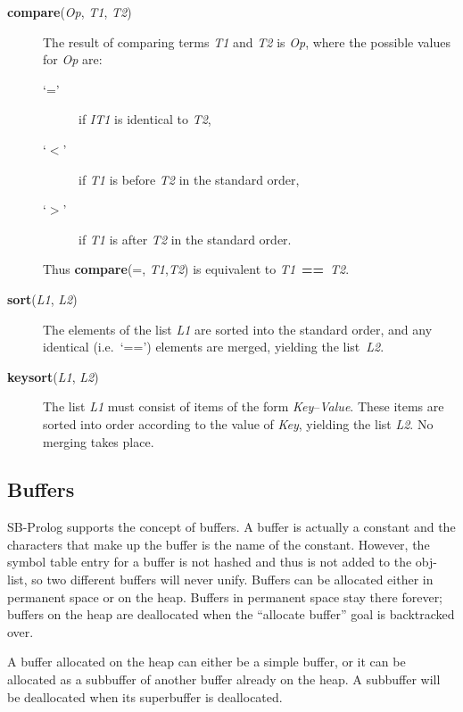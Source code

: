 \begin{description}
\item[{\bf compare}({\em Op}, {\em T1}, {\em T2})]
    The result of comparing terms {\em T1} and {\em T2} is {\em Op},
    where the possible values for {\em Op} are:
    \begin{description}
    \item[`='] if {\em IT1} is identical to {\em T2},

    \item[`$<$'] if {\em T1} is before {\em T2} in the standard order,

    \item[`$>$'] if {\em T1} is after {\em T2} in the standard order.
    \end{description}
    Thus {\bf compare}(=, {\em T1},{\em T2}) is equivalent to
    {\em T1}~{\bf ==}~{\em T2}.

\item[{\bf sort}({\em L1}, {\em L2})] 
    The elements of the list {\em L1} are sorted into the standard order,
    and any identical (i.e.\ `==') elements are merged,
    yielding the list~{\em L2}.

\item[{\bf keysort}({\em L1}, {\em L2})]
    The list {\em L1} must consist of items of the form {\em Key}--{\em Value}.
    These items are sorted into order according to the value of {\em Key},
    yielding the list {\em L2}.
    No merging takes place.
\end{description}

\subsection{Buffers}\label{buffers}

SB-Prolog supports the concept of buffers.
A buffer is actually a
constant and the characters that make up the buffer is the name of the constant.
However, the symbol table entry for a buffer is not hashed
and thus is not added to the obj-list,
so two different buffers will never unify.
Buffers can be allocated either in permanent space or on the heap.
Buffers in permanent space stay there forever; buffers on the heap
are deallocated when the ``allocate buffer'' goal is backtracked over.

A buffer allocated on the heap can either be a simple buffer,
or it can be allocated as a subbuffer of another buffer already on the heap.
A subbuffer will be deallocated when its superbuffer is deallocated.

